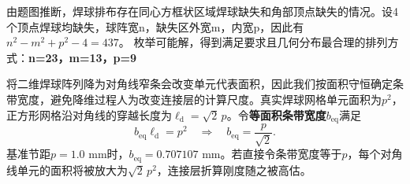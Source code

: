 \documentclass[draft,12pt,a4paper]{ctexart}
\theoremstyle{definition}
\begin{document}
由题图推断，焊球排布存在同心方框状区域焊球缺失和角部顶点缺失的情况。设4个顶点焊球均缺失，球阵宽n，缺失区外宽m，内宽p，因此有$n^2-m^2+p^2-4=437$。
枚举可能解，得到满足要求且几何分布最合理的排列方式：\textbf{n=23，m=13，p=9}

将二维焊球阵列降为对角线窄条会改变单元代表面积，因此我们按面积守恒确定条带宽度，避免降维过程人为改变连接层的计算尺度。真实焊球网格单元面积为$p^2$，正方形网格沿对角线的穿越长度为$\ell_{\mathrm d}=\sqrt2\,p$。令\textbf{等面积条带宽度}$b_{\mathrm{eq}}$满足
\begin{equation}\label{eq:q3-beq}
b_{\mathrm{eq}}\ell_{\mathrm d}=p^2
\quad\Longrightarrow\quad
b_{\mathrm{eq}}=\frac{p}{\sqrt2}.
\end{equation}
基准节距$p=1.0$ mm时，$b_{\mathrm{eq}}=0.707107$ mm。若直接令条带宽度等于$p$，每个对角线单元的面积将被放大为$\sqrt2\,p^2$，连接层折算刚度随之被高估。
\end{document}
